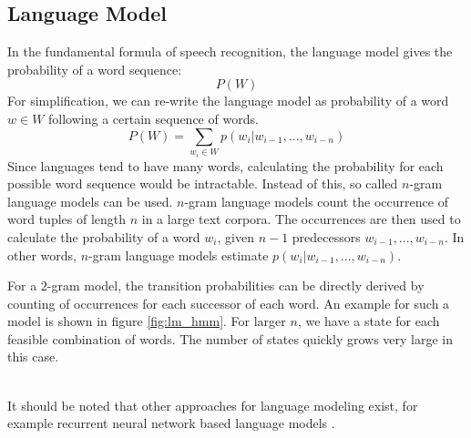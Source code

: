 \subsection{Language Model}
\label{sec:language_model}
In the fundamental formula of speech recognition, the language model gives the probability of a word sequence:
\[
P(W)
\]
For simplification, we can re-write the language model as probability of a word $w \in W$ following a certain sequence of words.
\[
P(W) = \sum_{w_i \in W} p(w_i|w_{i - 1},...,w_{i - n})
\]
Since languages tend to have many words, calculating the probability for each possible word sequence would be intractable. Instead of this, so called $n$-gram language models can be used. $n$-gram language models count the occurrence of word tuples of length $n$ in a large text corpora. The occurrences are then used to calculate the probability of a word $w_i$, given $n - 1$ predecessors $w_{i - 1}, ..., w_{i - n}$. In other words, $n$-gram language models estimate $p(w_i|w_{i - 1},...,w_{i - n})$. 

For a $2$-gram model, the transition probabilities can be directly derived by counting of occurrences for each successor of each word. An example for such a model is shown in figure \ref{fig:lm_hmm}. For larger $n$, we have a state for each feasible combination of words. The number of states quickly grows very large in this case. \\ \\
\begin{minipage}{\linewidth}
	\label{fig:lm_hmm}
	\hspace{1cm}
\end{minipage}
It should be noted that other approaches for language modeling exist, for example recurrent neural network based language models \cite{mikolov2011extensions}. 
